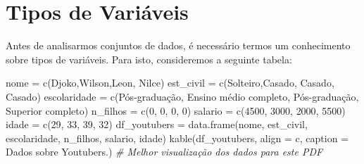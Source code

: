 \documentclass[
]{book}
\newenvironment{Shaded}{\begin{snugshade}}{\end{snugshade}}
\newcommand{\AttributeTok}[1]{\textcolor[rgb]{0.77,0.63,0.00}{#1}}
\newcommand{\CommentTok}[1]{\textcolor[rgb]{0.56,0.35,0.01}{\textit{#1}}}
\newcommand{\DecValTok}[1]{\textcolor[rgb]{0.00,0.00,0.81}{#1}}
\newcommand{\FunctionTok}[1]{\textcolor[rgb]{0.00,0.00,0.00}{#1}}
\newcommand{\NormalTok}[1]{#1}
\newcommand{\OtherTok}[1]{\textcolor[rgb]{0.56,0.35,0.01}{#1}}
\newcommand{\StringTok}[1]{\textcolor[rgb]{0.31,0.60,0.02}{#1}}
\begin{document}
\hypertarget{tipos-de-variuxe1veis}{%
\section{Tipos de Variáveis}\label{tipos-de-variuxe1veis}}

Antes de analisarmos conjuntos de dados, é necessário termos um conhecimento sobre tipos de variáveis. Para isto, consideremos a seguinte tabela:

\begin{Shaded}
\begin{Highlighting}[]
\NormalTok{nome }\OtherTok{=} \FunctionTok{c}\NormalTok{(}\StringTok{\textquotesingle{}Djoko\textquotesingle{}}\NormalTok{,}\StringTok{\textquotesingle{}Wilson\textquotesingle{}}\NormalTok{,}\StringTok{\textquotesingle{}Leon\textquotesingle{}}\NormalTok{, }\StringTok{\textquotesingle{}Nilce\textquotesingle{}}\NormalTok{)}
\NormalTok{est\_civil }\OtherTok{=} \FunctionTok{c}\NormalTok{(}\StringTok{\textquotesingle{}Solteiro\textquotesingle{}}\NormalTok{,}\StringTok{\textquotesingle{}Casado\textquotesingle{}}\NormalTok{, }\StringTok{\textquotesingle{}Casado\textquotesingle{}}\NormalTok{, }\StringTok{\textquotesingle{}Casado\textquotesingle{}}\NormalTok{)}
\NormalTok{escolaridade }\OtherTok{=} \FunctionTok{c}\NormalTok{(}\StringTok{\textquotesingle{}Pós{-}graduação\textquotesingle{}}\NormalTok{,}
                 \StringTok{\textquotesingle{}Ensino médio completo\textquotesingle{}}\NormalTok{,}
                 \StringTok{\textquotesingle{}Pós{-}graduação\textquotesingle{}}\NormalTok{,}
                 \StringTok{\textquotesingle{}Superior completo\textquotesingle{}}\NormalTok{)}
\NormalTok{n\_filhos }\OtherTok{=} \FunctionTok{c}\NormalTok{(}\DecValTok{0}\NormalTok{, }\DecValTok{0}\NormalTok{, }\DecValTok{0}\NormalTok{, }\DecValTok{0}\NormalTok{)}
\NormalTok{salario }\OtherTok{=} \FunctionTok{c}\NormalTok{(}\DecValTok{4500}\NormalTok{, }\DecValTok{3000}\NormalTok{, }\DecValTok{2000}\NormalTok{, }\DecValTok{5500}\NormalTok{)}
\NormalTok{idade }\OtherTok{=} \FunctionTok{c}\NormalTok{(}\DecValTok{29}\NormalTok{, }\DecValTok{33}\NormalTok{, }\DecValTok{39}\NormalTok{, }\DecValTok{32}\NormalTok{)}
\NormalTok{df\_youtubers }\OtherTok{=} \FunctionTok{data.frame}\NormalTok{(nome, est\_civil, escolaridade, n\_filhos, salario, idade)}
\FunctionTok{kable}\NormalTok{(df\_youtubers, }\AttributeTok{align =} \StringTok{\textquotesingle{}c\textquotesingle{}}\NormalTok{,}
      \AttributeTok{caption =} \StringTok{\textquotesingle{}Dados sobre Youtubers.\textquotesingle{}}\NormalTok{) }\CommentTok{\# Melhor visualização dos dados para este PDF}
\end{Highlighting}
\end{Shaded}
\end{document}

